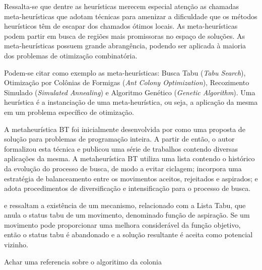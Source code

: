 Ressalta-se que dentre as heurísticas merecem especial atenção as chamadas meta-heurísticas que adotam técnicas para amenizar a dificuldade que os métodos heurísticos têm de escapar dos chamados ótimos locais. As meta-heurísticas podem partir em busca de regiões mais promissoras no espaço de soluções. As meta-heurísticas possuem grande abrangência, podendo ser aplicada à maioria dos problemas de otimização combinatória.\par

Podem-se citar como exemplo as meta-heurísticas: Busca Tabu (\textit{Tabu Search}), Otimização por Colônias de Formigas (\textit{Ant Colony Optimization}), Recozimento Simulado (\textit{Simulated Annealing}) e Algoritmo Genético (\textit{Genetic Algorithm}). Uma heurística é a instanciação de uma meta-heurística, ou seja, a aplicação da mesma em um problema específico de otimização.\par



A metaheurística BT foi inicialmente desenvolvida por \cite{glover1986future} como uma proposta de
solução para problemas de programação inteira. A partir de então, o autor formalizou esta
técnica e publicou uma série de trabalhos contendo diversas aplicações da mesma. A
metaheurística BT utiliza uma lista contendo o histórico da evolução do processo de busca, de
modo a evitar ciclagem; incorpora uma estratégia de balanceamento entre os movimentos
aceitos, rejeitados e aspirados; e adota procedimentos de diversificação e intensificação para o
processo de busca.\par
\cite{souza2000} e \cite{white2004using} ressaltam a existência de um mecanismo, relacionado com
a Lista Tabu, que anula o status tabu de um movimento, denominado função de aspiração. Se
um movimento pode proporcionar uma melhora considerável da função objetivo, então o
status tabu é abandonado e a solução resultante é aceita como potencial vizinho.


	Achar uma referencia sobre o algoritimo da colonia


